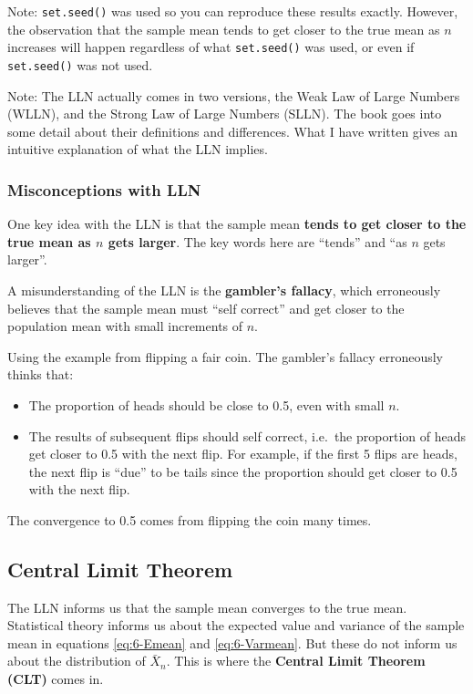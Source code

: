 \documentclass[
]{book}
\providecommand{\tightlist}{%
  \setlength{\itemsep}{0pt}\setlength{\parskip}{0pt}}
\begin{document}
Note: \texttt{set.seed()} was used so you can reproduce these results exactly. However, the observation that the sample mean tends to get closer to the true mean as \(n\) increases will happen regardless of what \texttt{set.seed()} was used, or even if \texttt{set.seed()} was not used.

Note: The LLN actually comes in two versions, the Weak Law of Large Numbers (WLLN), and the Strong Law of Large Numbers (SLLN). The book goes into some detail about their definitions and differences. What I have written gives an intuitive explanation of what the LLN implies.

\subsubsection{Misconceptions with LLN}\label{misconceptions-with-lln}

One key idea with the LLN is that the sample mean \textbf{tends to get closer to the true mean as \(n\) gets larger}. The key words here are ``tends'' and ``as \(n\) gets larger''.

A misunderstanding of the LLN is the \textbf{gambler's fallacy}, which erroneously believes that the sample mean must ``self correct'' and get closer to the population mean with small increments of \(n\).

Using the example from flipping a fair coin. The gambler's fallacy erroneously thinks that:

\begin{itemize}
\tightlist
\item
  The proportion of heads should be close to 0.5, even with small \(n\).
\item
  The results of subsequent flips should self correct, i.e.~the proportion of heads get closer to 0.5 with the next flip. For example, if the first 5 flips are heads, the next flip is ``due'' to be tails since the proportion should get closer to 0.5 with the next flip.
\end{itemize}

The convergence to 0.5 comes from flipping the coin many times.

\subsection{Central Limit Theorem}\label{central-limit-theorem}

The LLN informs us that the sample mean converges to the true mean. Statistical theory informs us about the expected value and variance of the sample mean in equations \eqref{eq:6-Emean} and \eqref{eq:6-Varmean}. But these do not inform us about the distribution of \(\bar{X}_n\). This is where the \textbf{Central Limit Theorem (CLT)} comes in.
\end{document}
